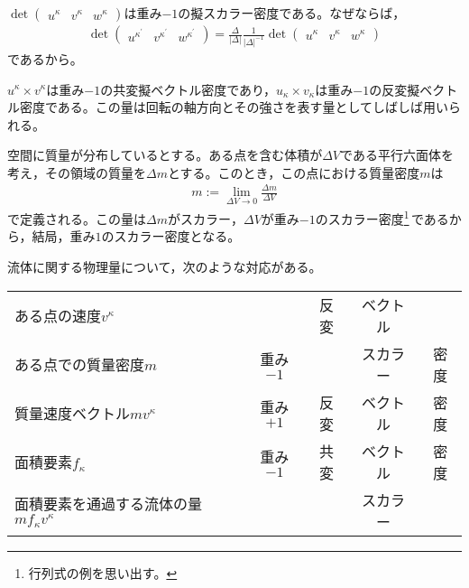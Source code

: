 \documentclass[uplatex]{jsarticle}
\begin{document}
\begin{rei}
  $\det \begin{pmatrix} u^{\kappa} & v^{\kappa} & w^{\kappa} \end{pmatrix}$は重み$-1$の擬スカラー密度である。なぜならば，
  \begin{align*}
  \det \begin{pmatrix} u^{\kappa^{\prime}} & v^{\kappa^{\prime}} & w^{\kappa^{\prime}} \end{pmatrix} =
  \frac{\Delta}{\left| \Delta \right|} \frac{1}{\left| \Delta \right|^{-1}} \det \begin{pmatrix} u^{\kappa} & v^{\kappa} & w^{\kappa} \end{pmatrix}
  \end{align*}
  であるから。
\end{rei}

\begin{rei}
  $u^{\kappa} \times v^{\kappa}$は重み$-1$の共変擬ベクトル密度であり，$u_{\kappa} \times v_{\kappa}$は重み$-1$の反変擬ベクトル密度である。この量は回転の軸方向とその強さを表す量としてしばしば用いられる。
\end{rei}

\begin{rei}
  空間に質量が分布しているとする。ある点を含む体積が$\Delta V$である平行六面体を考え，その領域の質量を$\Delta m$とする。このとき，この点における質量密度$m$は
  \begin{align}
    m := \lim_{\Delta V \to 0} \frac{\Delta m}{\Delta V}
  \end{align}
  で定義される。この量は$\Delta m$がスカラー，$\Delta V$が重み$-1$のスカラー密度\footnote{行列式の例を思い出す。}\,であるから，結局，重み$1$のスカラー密度となる。
\end{rei}

\begin{rei}
  流体に関する物理量について，次のような対応がある。
  \begin{center}
    \begin{tabular}{lc@{\quad}c@{}c@{}c} \hline
      ある点の速度$v^{\kappa}$ & & 反変 & ベクトル & \\
      ある点での質量密度$m$ & 重み$-1$ & & スカラー & 密度 \\
      質量速度ベクトル$mv^{\kappa}$ & 重み$+1$ & 反変 & ベクトル & 密度 \\
      面積要素$f_{\kappa}$ & 重み$-1$ & 共変 & ベクトル & 密度 \\
      面積要素を通過する流体の量$mf_{\kappa}v^{\kappa}$ & & & スカラー & \\ \hline 
    \end{tabular}
  \end{center}
\end{rei}
\end{document}
